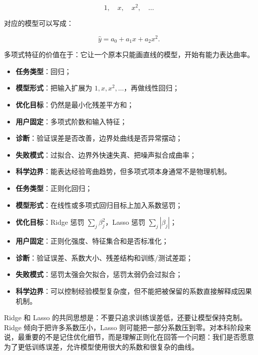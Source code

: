 \[
1,\quad x,\quad x^2,\quad \dots
\]

对应的模型可以写成：

\[
\hat{y} = a_0 + a_1 x + a_2 x^2.
\]

多项式特征的价值在于：它让一个原本只能画直线的模型，开始有能力表达曲率。

\begin{examplebox}
\begin{itemize}
    \item \textbf{任务类型}：回归；
    \item \textbf{模型形式}：把输入扩展为 \(1,x,x^2,\dots\)，再做线性回归；
    \item \textbf{优化目标}：仍然是最小化残差平方和；
    \item \textbf{用户固定}：多项式阶数和输入特征；
    \item \textbf{诊断}：验证误差是否改善，边界处曲线是否异常摆动；
    \item \textbf{失败模式}：过拟合、边界外快速失真、把噪声拟合成曲率；
    \item \textbf{科学边界}：能表达经验弯曲趋势，但多项式项本身通常不是物理机制。
\end{itemize}
\end{examplebox}

\begin{examplebox}
\begin{itemize}
    \item \textbf{任务类型}：正则化回归；
    \item \textbf{模型形式}：在线性或多项式回归目标上加入系数惩罚；
    \item \textbf{优化目标}：Ridge 惩罚 \(\sum_j \beta_j^2\)，Lasso 惩罚 \(\sum_j |\beta_j|\)；
    \item \textbf{用户固定}：正则化强度、特征集合和是否标准化；
    \item \textbf{诊断}：验证误差、系数大小、残差结构和训练/测试差距；
    \item \textbf{失败模式}：惩罚太强会欠拟合，惩罚太弱仍会过拟合；
    \item \textbf{科学边界}：可以控制经验模型复杂度，但不能把被保留的系数直接解释成因果机制。
\end{itemize}
\end{examplebox}

Ridge 和 Lasso 的共同思想是：不要只追求训练误差低，还要让模型保持克制。Ridge 倾向于把许多系数压小，Lasso 则可能把一部分系数压到零。对本科阶段来说，最重要的不是记住优化细节，而是理解正则化在回答一个问题：我们是否愿意为了更低训练误差，允许模型使用很大的系数和很复杂的曲线。

